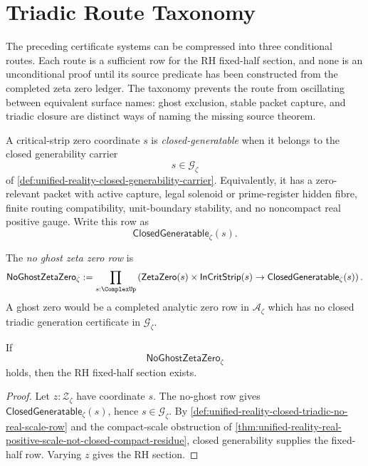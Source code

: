 \section{Triadic Route Taxonomy}
\label{sec:unified-reality-triadic-route-taxonomy}

The preceding certificate systems can be compressed into three
conditional routes.  Each route is a sufficient row for the RH fixed-half
section, and none is an unconditional proof until its source predicate
has been constructed from the completed zeta zero ledger.  The taxonomy
prevents the route from oscillating between equivalent surface names:
ghost exclusion, stable packet capture, and triadic closure are distinct
ways of naming the missing source theorem.

\begin{definition}
\label{def:unified-reality-closed-generatable-zero}
A critical-strip zero coordinate $s$ is \emph{closed-generatable} when it
belongs to the closed generability carrier
$$
s\in\mathcal G_{\zeta}
$$
of
\autoref{def:unified-reality-closed-generability-carrier}.  Equivalently,
it has a zero-relevant packet with active capture, legal solenoid or
prime-register hidden fibre, finite routing compatibility, unit-boundary
stability, and no noncompact real positive gauge.
Write this row as
$$
\mathsf{ClosedGeneratable}_{\zeta}(s).
$$
\end{definition}

\begin{definition}
\label{def:unified-reality-no-ghost-zeta-zero-row}
The \emph{no ghost zeta zero row} is
$$
\mathsf{NoGhostZetaZero}_{\zeta}
:=
\prod_{s:\ComplexUp}
\left(
\mathsf{ZetaZero}(s)
\times
\mathsf{InCritStrip}(s)
\to
\mathsf{ClosedGeneratable}_{\zeta}(s)
\right).
$$
A ghost zero would be a completed analytic zero row in
$\mathcal A_{\zeta}$ which has no closed triadic generation certificate
in $\mathcal G_{\zeta}$.
\end{definition}

\begin{corollary}
\label{cor:unified-reality-no-ghost-zeros-conditionally-sufficient}
If
$$
\mathsf{NoGhostZetaZero}_{\zeta}
$$
holds, then the RH fixed-half section exists.
\end{corollary}

\begin{proof}
Let $z:\mathcal Z_{\zeta}$ have coordinate $s$.  The no-ghost row gives
$\mathsf{ClosedGeneratable}_{\zeta}(s)$, hence $s\in\mathcal G_{\zeta}$.
By
\autoref{def:unified-reality-closed-triadic-no-real-scale-row} and the
compact-scale obstruction of
\autoref{thm:unified-reality-real-positive-scale-not-closed-compact-residue},
closed generability supplies the fixed-half row.  Varying $z$ gives the
RH section.
\end{proof}

